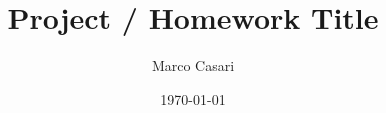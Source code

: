 \documentclass[a4paper,10pt,draft]{article}
\begin{document}
\title{Project / Homework Title}
\author{Marco Casari}
\date{\today}
\maketitle

\tableofcontents %
\newpage

\printbibliography[heading=bibintoc]
\end{document}
